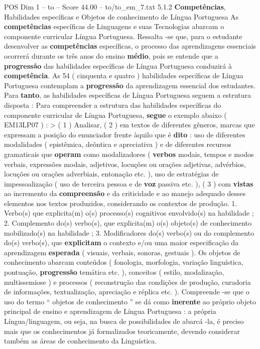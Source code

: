 \begin{textsample}{POS Dim 1 – to – Score 44.00 – to/to\_em\_7.txt}  \label{ex:f1_pos_257}
5.1.2 \textbf{Competências}, Habilidades específicas e Objetos de conhecimento de Língua Portuguesa As \textbf{competências} específicas de Linguagens e suas Tecnologias abarcam o componente curricular Língua Portuguesa.
Ressalta -se que, para o estudante desenvolver as \textbf{competências} específicas, o processo das aprendizagens essenciais ocorrerá durante os três anos do ensino \textbf{médio}, pois se entende que a \textbf{progressão} das habilidades específicas de Língua Portuguesa conduzirá à \textbf{competência}.
As 54 ( cinquenta e quatro ) habilidades específicas de Língua Portuguesa contemplam a \textbf{progressão} da aprendizagem essencial dos estudantes.
Para \textbf{tanto}, as habilidades específicas de Língua Portuguesa seguem a estrutura disposta : Para compreender a estrutura das habilidades específicas do componente curricular de Língua Portuguesa, \textbf{segue} o exemplo abaixo ( EM13LP07 ) : > ( 1 ) Analisar, ( 2 ) em textos de diferentes gêneros, marcas que expressam a posição do enunciador frente àquilo que é \textbf{dito} : uso de diferentes modalidades ( epistêmica, deôntica e apreciativa ) e de diferentes recursos gramaticais que \textbf{operam} como modalizadores ( \textbf{verbos} modais, tempos e modos verbais, expressões modais, adjetivos, locuções ou orações adjetivas, advérbios, locuções ou orações adverbiais, entonação etc. ), uso de estratégias de impessoalização ( uso de terceira pessoa e de \textbf{voz} passiva etc. ), ( 3 ) com \textbf{vistas} ao incremento da \textbf{compreensão} e da criticidade e ao manejo adequado desses elementos nos textos produzidos, considerando os contextos de produção. 1.
Verbo(s) que explicita(m) o(s) processo(s) cognitivos envolvido(s) na habilidade ; 2.
Complemento do(s) verbo(s), que explicita(m) o(s) objeto(s) de conhecimento mobilizado(s) na habilidade ; 3.
Modificadores do(s) verbo(s) ou do complemento do(s) verbo(s), que \textbf{explicitam} o contexto e/ou uma maior especificação da aprendizagem \textbf{esperada} ( visuais, verbais, sonoras, gestuais ).
Os objetos de conhecimento abarcam conteúdos ( fonologia, morfologia, variação linguística, pontuação, \textbf{progressão} temática etc. ), conceitos ( estilo, modalização, multissemiose ) e processos ( reconstrução das condições de produção, curadoria de informações, textualização, apreciação e réplica etc. ).
Compreende -se que o uso do termo “ objetos de conhecimento ” se dá como \textbf{inerente} ao próprio objeto principal de ensino e aprendizagem de Língua Portuguesa : a própria Língua/linguagem, ou seja, na busca de possibilidades de abarcá -la, é preciso mais que os conhecimentos já formalizados teoricamente, devendo considerar também as áreas de conhecimento da Linguística.

\end{textsample}
